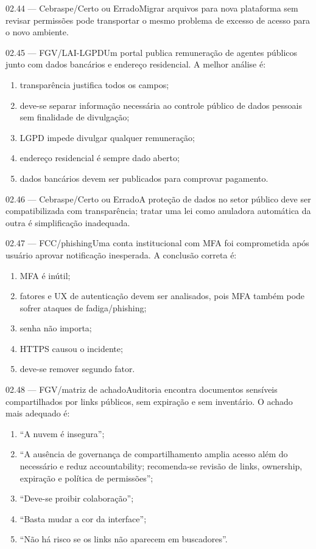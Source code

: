 \begin{questao}{ 02.44 — Cebraspe/Certo ou Errado}Migrar arquivos para nova plataforma sem revisar permissões pode transportar o mesmo problema de excesso de acesso para o novo ambiente.\end{questao}
\begin{questao}{ 02.45 — FGV/LAI-LGPD}Um portal publica remuneração de agentes públicos junto com dados bancários e endereço residencial. A melhor análise é:\begin{enumerate}[label=\Alph*)]\item transparência justifica todos os campos;\item deve-se separar informação necessária ao controle público de dados pessoais sem finalidade de divulgação;\item LGPD impede divulgar qualquer remuneração;\item endereço residencial é sempre dado aberto;\item dados bancários devem ser publicados para comprovar pagamento.\end{enumerate}\end{questao}
\begin{questao}{ 02.46 — Cebraspe/Certo ou Errado}A proteção de dados no setor público deve ser compatibilizada com transparência; tratar uma lei como anuladora automática da outra é simplificação inadequada.\end{questao}
\begin{questao}{ 02.47 — FCC/phishing}Uma conta institucional com MFA foi comprometida após usuário aprovar notificação inesperada. A conclusão correta é:\begin{enumerate}[label=\Alph*)]\item MFA é inútil;\item fatores e UX de autenticação devem ser analisados, pois MFA também pode sofrer ataques de fadiga/phishing;\item senha não importa;\item HTTPS causou o incidente;\item deve-se remover segundo fator.\end{enumerate}\end{questao}
\begin{questao}{ 02.48 — FGV/matriz de achado}Auditoria encontra documentos sensíveis compartilhados por links públicos, sem expiração e sem inventário. O achado mais adequado é:\begin{enumerate}[label=\Alph*)]\item ``A nuvem é insegura'';\item ``A ausência de governança de compartilhamento amplia acesso além do necessário e reduz accountability; recomenda-se revisão de links, ownership, expiração e política de permissões'';\item ``Deve-se proibir colaboração'';\item ``Basta mudar a cor da interface'';\item ``Não há risco se os links não aparecem em buscadores''.\end{enumerate}\end{questao}
